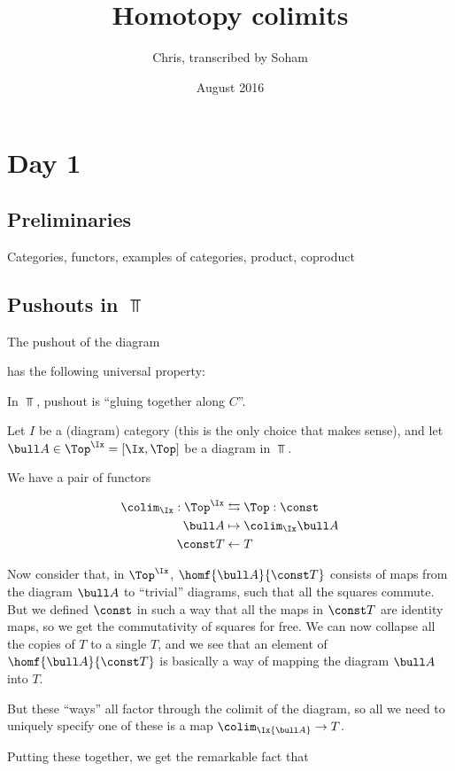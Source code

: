 \documentclass{article}
\title{Homotopy colimits}
\author{Chris, transcribed by Soham}
\date{August 2016}
\begin{document}
\maketitle

\section{Day 1}
\subsection{Preliminaries}
Categories, functors, examples of categories, product, coproduct

\subsection{Pushouts in $\Top$}
The pushout of the diagram

has the following universal property:

\begin{example}
 In $\Top$, pushout is ``gluing together along $C$''. 
\end{example}

Let $I$ be a (diagram) category (this is the only choice that makes sense), and
let $\bull A\in \Top^\Ix = [\Ix, \Top]$ be a diagram in $\Top$.

We have a pair of functors

\begin{align*}
\colim_\Ix: \Top^\Ix &\leftrightarrows \Top :\const \\ 
  \bull A &\mapsto \colim_\Ix \bull A \\
  \const T &\leftarrow T
\end{align*}

Now consider that, in $\Top^\Ix$,
$\homf{\bull A}{\const T}$ consists of maps from the diagram $\bull A$ to
``trivial'' diagrams, such that all the squares commute. But we defined $\const$
in such a way that all the maps in $\const T$ are identity maps, so we get the
commutativity of squares for free. We can now collapse all the copies of $T$ to
a single $T$, and we see that an element of $\homf {\bull A}{\const T}$ is
  basically a way of mapping the diagram $\bull A$ into $T$.

But these ``ways'' all factor through the colimit of the diagram, so all
we need to uniquely specify one of these is a map $\colim_\Ix{\bull A}\to T$.

Putting these together, we get the remarkable fact that
\end{document}
